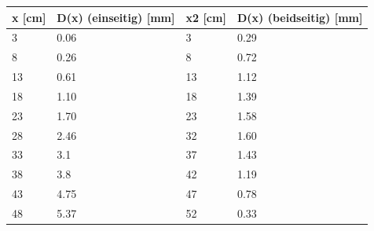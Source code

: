 \begin{minipage}{\linewidth}
    \begin{table}[H]
        \centering
    \begin{tabular}{llll}
        \toprule
        x [cm] & D(x) (einseitig) [mm] & x2 [cm] & D(x) (beidseitig) [mm] \\
        \midrule
        3  & 0.06 & 3  & 0.29 \\ 
        8  & 0.26 & 8  & 0.72 \\ 
        13 & 0.61 & 13 & 1.12 \\ 
        18 & 1.10 & 18 & 1.39 \\ 
        23 & 1.70 & 23 & 1.58 \\ 
        28 & 2.46 & 32 & 1.60 \\ 
        33 & 3.1  & 37 & 1.43 \\ 
        38 & 3.8  & 42 & 1.19 \\ 
        43 & 4.75 & 47 & 0.78 \\ 
        48 & 5.37 & 52 & 0.33 \\ 
        \bottomrule   
    \end{tabular}
    
    \label{tab:4}
\end{table}
\end{minipage}